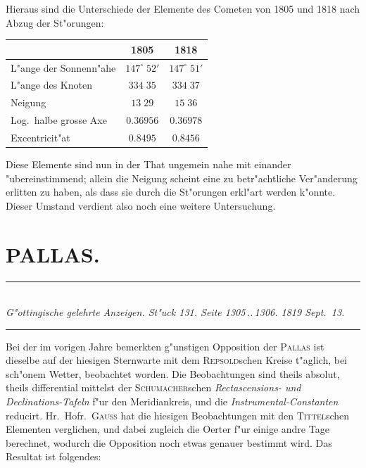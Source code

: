 \documentclass[12pt,a4paper]{article}
\begin{document}
Hieraus sind die Unterschiede der Elemente des Cometen von 1805 und 1818 nach Abzug der
St"orungen:

\begin{center}
\begin{tabular}{l|c|c}
\toprule
& 1805 & 1818 \\
\midrule
L"ange der Sonnenn"ahe & $147^{\circ}\;52'$ & $147^{\circ}\;51'$ \\
L"ange des Knoten & $334\;35$ & $334\;37$ \\
Neigung & $13\;29$ & $15\;36$ \\
Log.~halbe grosse Axe & $0.36956$ & $0.36978$ \\
Excentricit"at & $0.8495$ & $0.8456$ \\
\bottomrule
\end{tabular}
\end{center}

Diese Elemente sind nun in der That ungemein nahe mit einander "ubereinstimmend; allein die
Neigung scheint eine zu betr"achtliche Ver"anderung erlitten zu haben, als dass sie durch die St"orungen
erkl"art werden k"onnte. Dieser Umstand verdient also noch eine weitere Untersuchung.

\newpage

\section*{PALLAS.}

\begin{center}
\rule{0.6\textwidth}{0.4pt}\\[0.5em]
\textit{G"ottingische gelehrte Anzeigen. St"uck 131. Seite 1305\,..\,1306. 1819 Sept.~13.}\\[0.3em]
\rule{0.6\textwidth}{0.4pt}
\end{center}

Bei der im vorigen Jahre bemerkten g"unstigen Opposition der \textsc{Pallas} ist dieselbe auf der hiesigen
Sternwarte mit dem \textsc{Repsold}schen Kreise t"aglich, bei sch"onem Wetter, beobachtet worden. Die
Beobachtungen sind theils absolut, theils differential mittelst der \textsc{Schumacher}schen \textit{Rectascensions- und
Declinations-Tafeln} f"ur den Meridiankreis, und die \textit{Instrumental-Constanten} reducirt. Hr.~Hofr.~\textsc{Gauss}
hat die hiesigen Beobachtungen mit den \textsc{Tittel}schen Elementen verglichen, und dabei zugleich die Oerter
f"ur einige andre Tage berechnet, wodurch die Opposition noch etwas genauer bestimmt wird. Das
Resultat ist folgendes:
\end{document}
